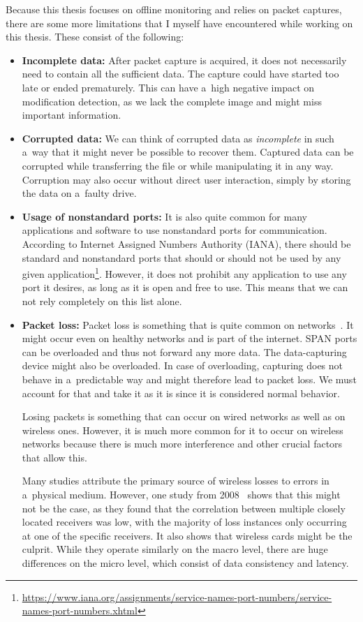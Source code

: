 \documentclass[
  printed,     %
  color,       %
  oneside,     %
  nosansbold,  %
  nocolorbold, %
  nolof,         %
  nolot,         %
]{fithesis4}
\begin{document}
Because this thesis focuses on offline monitoring and relies on packet captures, there are some more limitations that I myself have encountered while working on this thesis. These consist of the following:
\begin{itemize}
\item \textbf{Incomplete data:} After packet capture is acquired, it does not necessarily need to contain all the sufficient data. The capture could have started too late or ended prematurely. This can have a~high negative impact on modification detection, as we lack the complete image and might miss important information.

\item \textbf{Corrupted data:} We can think of corrupted data as \textit{incomplete} in such a~way that it might never be possible to recover them. Captured data can be corrupted while transferring the file or while manipulating it in any way. Corruption may also occur without direct user interaction, simply by storing the data on a~faulty drive.

\item \textbf{Usage of nonstandard ports:} It is also quite common for many applications and software to use nonstandard ports for communication. According to Internet Assigned Numbers Authority (IANA), there should be standard and nonstandard ports that should or should not be used by any given application\footnote{\url{https://www.iana.org/assignments/service-names-port-numbers/service-names-port-numbers.xhtml}}. However, it does not prohibit any application to use any port it desires, as long as it is open and free to use. This means that we can not rely completely on this list alone.

\item \textbf{Packet loss:} Packet loss is something that is quite common on networks~\cite{4594875}. It might occur even on healthy networks and is part of the internet. SPAN ports can be overloaded and thus not forward any more data. The data-capturing device might also be overloaded. In case of overloading, capturing does not behave in a~predictable way and might therefore lead to packet loss. We must account for that and take it as it is since it is considered normal behavior.

Losing packets is something that can occur on wired networks as well as on wireless ones. However, it is much more common for it to occur on wireless networks because there is much more interference and other crucial factors that allow this.

Many studies attribute the primary source of wireless losses to errors in a~physical medium. However, one study from 2008~\cite{4594875} shows that this might not be the case, as they found that the correlation between multiple closely located receivers was low, with the majority of loss instances only occurring at one of the specific receivers. It also shows that wireless cards might be the culprit. While they operate similarly on the macro level, there are huge differences on the micro level, which consist of data consistency and latency.

\end{itemize}
\end{document}
